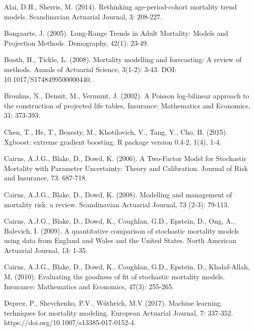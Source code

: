 \documentclass[a4,11pt]{article}
\begin{document}
\begin{thebibliography}{99}

Alai, D.H., Sherris, M. (2014). Rethinking age-period-cohort mortality trend models. Scandinavian Actuarial Journal, 3: 208-227.

Bongaarts, J. (2005). Long-Range Trends in Adult Mortality: Models and Projection Methods. Demography, 42(1): 23-49.

Booth, H., Tickle, L. (2008). Mortality modelling and forecasting: A review of methods. Annals of Actuarial Science, 3(1-2): 3-43. DOI: 10.1017/S1748499500000440.

Brouhns, N., Denuit, M., Vermunt, J. (2002). A Poisson log-bilinear approach to the construction of projected life tables, Insurance: Mathematics and Economics, 31: 373-393.

Chen, T., He, T., Benesty, M., Khotilovich, V., Tang, Y., Cho, H. (2015). Xgboost: extreme gradient boosting. R package version 0.4-2, 1(4), 1-4.

Cairns, A.J.G., Blake, D., Dowd, K. (2006). A Two-Factor Model for Stochastic Mortality with Parameter Uncertainty: Theory and Calibration. Journal of Risk and Insurance, 73: 687-718.

Cairns, A.J.G., Blake, D., Dowd, K. (2008). Modelling and management of mortality risk: a review. Scandinavian Actuarial Journal, 73 (2-3): 79-113.

Cairns, A.J.G., Blake, D., Dowd, K., Coughlan, G.D., Epstein, D., Ong, A., Balevich, I. (2009). A quantitative comparison of stochastic mortality models using data from England and Wales and the United States. North American Actuarial Journal, 13: 1-35.

Cairns, A.J.G., Blake, D., Dowd, K., Coughlan, G.D., Epstein, D., Khalaf-Allah, M. (2010). Evaluating the goodness of fit of stochastic mortality models. Insurance: Mathematics and Economics, 47(3): 255-265.

Deprez, P., Shevchenko, P.V., W\'uthrich, M.V (2017). Machine learning techniques for mortality modeling. European Actuarial Journal, 7: 337-352. https://doi.org/10.1007/s13385-017-0152-4.


\end{thebibliography}
\end{document}
